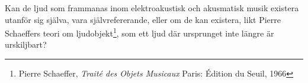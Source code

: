 \documentclass{article}
\begin{document}
%

Kan de ljud som frammanas inom elektroakustisk och akusmatisk musik existera utanför sig
själva, vara självrefererande, eller om de kan existera, likt Pierre Schaeffers teori om
ljudobjekt\footnote{Pierre Schaeffer, \emph{Traité des Objets Musicaux} Paris: Édition du Seuil, 1966}, som
ett ljud där ursprunget inte längre är urskiljbart? 
\end{document}
